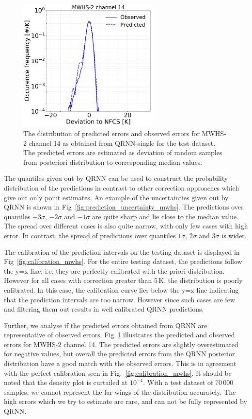 \documentclass[amt, manuscript]{copernicus}
\begin{document}
\begin{figure}[t]
	\includegraphics[width=70mm]{Figures/deviation_posterior_mwhs_samples_14.pdf}	
	\caption{The distribution of predicted errors and observed errors for MWHS-2 channel 14 as obtained from QRNN-single for the test dataset. The predicted errors are estimated as deviation of random samples from posteriori distribution to corresponding median values.}
	\label{fig:predicted_errors_mwhs}	
\end{figure}

The quantiles given out by QRNN can be used to construct the probability distribution of the predictions in contrast to other correction approaches which give out only point estimates. An example of the uncertainties given out by QRNN is shown in Fig~\ref{fig:prediction_uncertainty_mwhs}. The predictions over quantiles $-3\sigma$, $-2\sigma$ and $-1\sigma$ are quite sharp and lie close to the median value. The spread over different cases is also quite narrow, with only few cases with high error. In contrast, the spread of predictions over quantiles $1\sigma$, $2\sigma$ and $3\sigma$ is wider. 

The calibration of the prediction intervals on the testing dataset is displayed in Fig~\ref{fig:calibration_mwhs}. For the entire testing dataset, the predictions follow the y=x line, i.e. they are perfectly calibrated with the priori distribution. However for all cases with correction greater than 5\,K, the distribution is poorly calibrated. In this case, the calibration curve lies below the y=x line indicating that the prediction intervals are too narrow.  However since such cases are few and filtering them out results in well calibrated QRNN predictions. 

Further, we analyse if the  predicted errors obtained from QRNN are representative of observed errors. Fig~\ref{fig:predicted_errors_mwhs} illustrates the predicted and observed errors for MWHS-2 channel 14. The predicted errors are slightly overestimated for negative values, but overall the predicted errors from the QRNN posterior distribution have a good match with the observed errors. This is in agreement with the perfect calibration seen in Fig.~\ref{fig:calibration_mwhs}. It should be noted that the density plot is curtailed at $10^{-4}$. With a test dataset of 70\,000 samples, we cannot represent the far wings of the distribution accurately. The high errors which we try to estimate are rare, and can not be fully represented by QRNN. 
\end{document}
